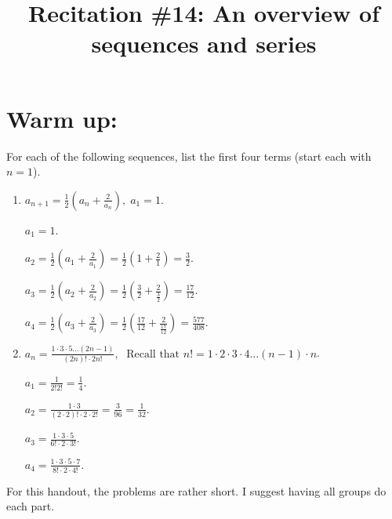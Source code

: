 \documentclass[handout]{ximera}
\title{Recitation \#14: An overview of sequences and series}
\begin{document}
\begin{abstract}		\end{abstract}
\maketitle




\section{Warm up:}

	For each of the following sequences, list the first four terms (start each with $n=1$).
	\begin{enumerate}
	\item 	$a_{n+1} = \frac{1}{2} \left( a_n + \frac{2}{a_n} \right), \; a_1 = 1$.
	\begin{freeResponse}
	  \; $a_1 = 1$.
	
	  \; $a_2 = \frac{1}{2} \left( a_1 + \frac{2}{a_1} \right) = \frac{1}{2} \left( 1 + \frac{2}{1} \right) = \frac{3}{2}$.
	
	  \; $a_3 = \frac{1}{2} \left( a_2 + \frac{2}{a_2} \right) = \frac{1}{2} \left( \frac{3}{2} + \frac{2}{\frac{3}{2}} \right) = \frac{17}{12}$.
	
	  \; $a_4 = \frac{1}{2} \left( a_3 + \frac{2}{a_3} \right) = \frac{1}{2} \left( \frac{17}{12} + \frac{2}{\frac{17}{12}} \right) = \frac{577}{408}.$
	\end{freeResponse}
	
	
	
	\item 	$a_n = \frac{1 \cdot 3 \cdot 5 \hdots (2n-1)}{(2n)! \cdot 2n!}, \; \text{ Recall that }n! = 1 \cdot 2 \cdot 3 \cdot 4 \hdots (n-1) \cdot n$.
	\begin{freeResponse}
	  \; $a_1 = \frac{1}{2! 2!} = \frac{1}{4}$.
	
	  \; $a_2 = \frac{1 \cdot 3}{(2 \cdot 2)! \cdot 2 \cdot 2!} = \frac{3}{96} = \frac{1}{32}$.
	
	  \; $a_3 = \frac{1 \cdot 3 \cdot 5}{6! \cdot 2 \cdot 3!}$.
	
	  \; $a_4 = \frac{1 \cdot 3 \cdot 5 \cdot 7}{8! \cdot 2 \cdot 4!}$.
	\end{freeResponse}
	\end{enumerate}
	
\begin{instructorNotes}
For this handout, the problems are rather short. I suggest having all groups do each part.
\end{instructorNotes}
\end{document}
